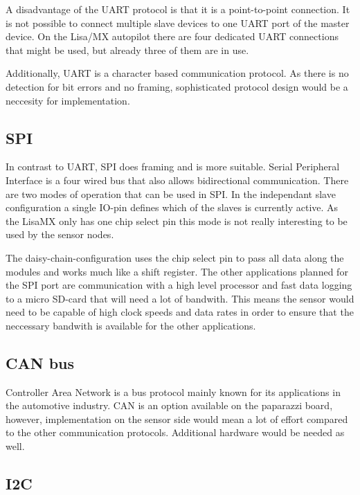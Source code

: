 A disadvantage of the UART protocol is that it is a point-to-point connection.
It is not possible to connect multiple slave devices to one UART port of the master device.
On the Lisa/MX autopilot there are four dedicated UART connections that might be used, but already three of them are in use.

Additionally, UART is a character based communication protocol.
As there is no detection for bit errors and no framing, sophisticated protocol design would be a neccesity for implementation.


\subsection{SPI}
In contrast to UART, SPI does framing and is more suitable.
Serial Peripheral Interface is a four wired bus that also allows bidirectional communication.
There are two modes of operation that can be used in SPI.
In the independant slave configuration a single IO-pin defines which of the slaves is currently active.
As the LisaMX only has one chip select pin this mode is not really interesting to be used by the sensor nodes.


The daisy-chain-configuration uses the chip select pin to pass all data along the modules and works much like a shift register.
The other applications planned for the SPI port are communication with a high level processor and fast data logging to a micro SD-card that will need a lot of bandwith.
This means the sensor would need to be capable of high clock speeds and data rates in order to ensure that the neccessary bandwith is available for the other applications.


\subsection{CAN bus}
Controller Area Network is a bus protocol mainly known for its applications in the automotive industry.
CAN is an option available on the paparazzi board, however, implementation on the sensor side would mean a lot of effort compared to the other communication protocols.
Additional hardware would be needed as well.


\subsection{I2C}

